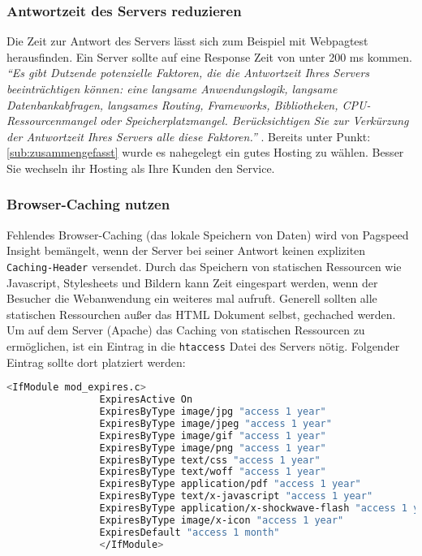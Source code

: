 			\subsubsection{Antwortzeit des Servers reduzieren} %
			\label{ssub:antwortzeit_des_servers_reduzieren}
				Die Zeit zur Antwort des Servers lässt sich zum Beispiel mit Webpagtest herausfinden. Ein Server sollte auf eine Response Zeit von unter 200 ms kommen. \textit{"`Es gibt Dutzende potenzielle Faktoren, die die Antwortzeit Ihres Servers beeinträchtigen können: eine langsame Anwendungslogik, langsame Datenbankabfragen, langsames Routing, Frameworks, Bibliotheken, CPU-Ressourcenmangel oder Speicherplatzmangel. Berücksichtigen Sie zur Verkürzung der Antwortzeit Ihres Servers alle diese Faktoren."'} \autocite{google15}. Bereits unter Punkt: \ref{sub:zusammengefasst} wurde es nahegelegt ein gutes Hosting zu wählen. Besser Sie wechseln ihr Hosting als Ihre Kunden den Service.

			\subsubsection{Browser-Caching nutzen} %
			\label{ssub:browser_caching_nutzen}
				Fehlendes Browser-Caching (das lokale Speichern von Daten) wird von Pagspeed Insight bemängelt, wenn der Server bei seiner Antwort keinen expliziten \texttt{Caching-Header} versendet.
				Durch das Speichern von statischen Ressourcen wie Javascript, Stylesheets und Bildern kann Zeit eingespart werden, wenn der Besucher die Webanwendung ein weiteres mal aufruft. Generell sollten alle statischen Ressourchen außer das HTML Dokument selbst, gechached werden.
				Um auf dem Server (Apache) das Caching von statischen Ressourcen zu ermöglichen, ist ein Eintrag in die \texttt{htaccess} Datei des Servers nötig. Folgender Eintrag sollte dort platziert werden:

			  \begin{lstlisting}[captionpos=b, caption=Aktivieren von Browser Caching in Apache (Listing nach: \autocite{sextonCaching}), label=lst:caching, language=bash]
			  	<IfModule mod_expires.c>
			  	ExpiresActive On
			  	ExpiresByType image/jpg "access 1 year"
			  	ExpiresByType image/jpeg "access 1 year"
			  	ExpiresByType image/gif "access 1 year"
			  	ExpiresByType image/png "access 1 year"
			  	ExpiresByType text/css "access 1 year"
			  	ExpiresByType text/woff "access 1 year"
			  	ExpiresByType application/pdf "access 1 year"
			  	ExpiresByType text/x-javascript "access 1 year"
			  	ExpiresByType application/x-shockwave-flash "access 1 year"
			  	ExpiresByType image/x-icon "access 1 year"
			  	ExpiresDefault "access 1 month"
			  	</IfModule>
			  \end{lstlisting}

